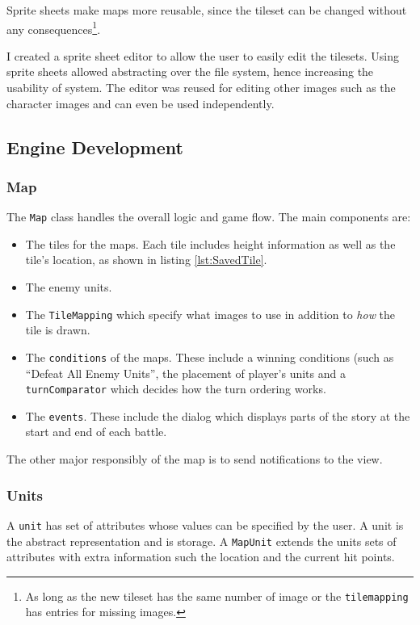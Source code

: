 Sprite sheets make maps more reusable, since the tileset can be changed without any consequences\footnote{As long as the new tileset has the same number of image or the \texttt{tilemapping} has entries for missing images.}.  

I created a sprite sheet editor to allow the user to easily edit the tilesets. Using sprite sheets allowed abstracting over the file system, hence increasing the usability of system. The editor was reused for editing other images such as the character images and can even be used independently.

\clearpage
\subsection{Engine Development}
\label{sub:engine_development_and_testing}
\subsubsection{Map}
\label{ssub:maps}


The \texttt{Map} class handles the overall logic and game flow.   The main components are:
\begin{itemize}
\item The tiles for the maps. Each tile includes height information as well as the tile's location, as shown in listing \ref{lst:SavedTile}.

\item The enemy units.     

\item The \texttt{TileMapping} which specify what images to use in addition to \emph{how} the tile is drawn. 

\item  The \texttt{conditions} of the maps. These include a winning conditions (such as ``Defeat All Enemy Units'',  the placement of player's units and a \texttt{turnComparator} which decides how the turn ordering works.  

\item  The \texttt{events}. These include the dialog which displays parts of the story at the start and end of each battle. 
\end{itemize}

The other major responsibly of the map is to send notifications to the view.  

\subsubsection{Units}
\label{ssub:units}
A \texttt{unit} has set of attributes whose values can be specified by the user. A unit is the abstract representation and is storage.  A \texttt{MapUnit} extends the units sets of attributes with extra information such the location and the current hit points.

